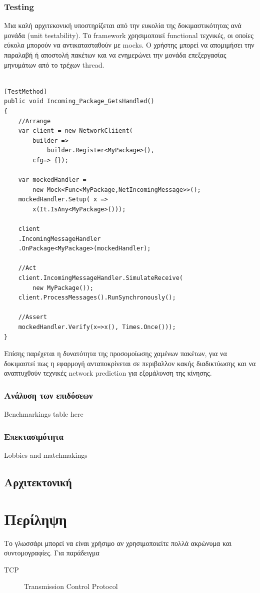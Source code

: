 \documentclass[oneside, 12pt]{book}
\begin{document}
	\subsection{Testing}
	Μια καλή αρχιτεκονική υποστηρίζεται από την ευκολία της δοκιμαστικότητας ανά μονάδα (unit testability). Το framework χρησιμοποιεί functional τεχνικές, οι οποίες εύκολα μπορούν να αντικατασταθούν με mocks. Ο χρήστης μπορεί να απομιμήσει την παραλαβή ή αποστολή πακέτων και να ενημερώνει την μονάδα επεξεργασίας μηνυμάτων από το τρέχων thread.
	
	\lstset{style=sharpc}
	\begin{lstlisting}
	
[TestMethod]
public void Incoming_Package_GetsHandled()
{
	//Arrange
	var client = new NetworkCliient(
		builder => 
			builder.Register<MyPackage>(),
		cfg=> {});
		
	var mockedHandler = 
		new Mock<Func<MyPackage,NetIncomingMessage>>();
	mockedHandler.Setup( x => 
		x(It.IsAny<MyPackage>()));
	
	client
	.IncomingMessageHandler
	.OnPackage<MyPackage>(mockedHandler);	
	
	//Act	
	client.IncomingMessageHandler.SimulateReceive(
		new MyPackage());	
	client.ProcessMessages().RunSynchronously();
	
	//Assert
	mockedHandler.Verify(x=>x(), Times.Once()));
}
	\end{lstlisting}
		
	Επίσης παρέχεται η δυνατότητα της προσομοίωσης χαμένων πακέτων, για να δοκιμαστεί πως η εφαρμογή ανταποκρίνεται σε περιβαλλον κακής διαδικτύωσης και να αναπτυχθούν τεχνικές network prediction για εξομάλυνση της κίνησης.
	
	
	\subsection{Ανάλυση των επιδόσεων}
	Benchmarkings table here
	
	\subsection{Επεκτασιμότητα}
	Lobbies and matchmakings
	
	

	\section{Αρχιτεκτονική}		
	
	\chapter{Περίληψη}
	
	\begin{Glossary}
		Το γλωσσάρι μπορεί να είναι χρήσιμο αν χρησιμοποιείτε πολλά ακρώνυμα
		και συντομογραφίες. Για παράδειγμα
		\begin{description}
			\item[TCP]Transmission Control Protocol
		\end{description}
	\end{Glossary}
	
	\printbibliography
	
\end{document}
